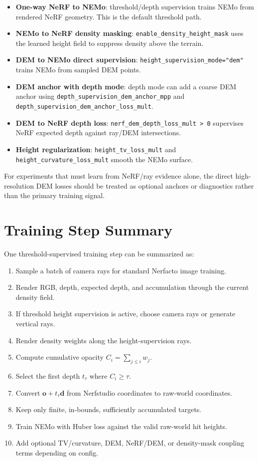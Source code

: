 \documentclass[11pt]{article}
\begin{document}
\begin{itemize}[leftmargin=*]
  \item \textbf{One-way NeRF to NEMo}: threshold/depth supervision trains NEMo from rendered NeRF geometry. This is the default threshold path.
  \item \textbf{NEMo to NeRF density masking}: \texttt{enable\_density\_height\_mask} uses the learned height field to suppress density above the terrain.
  \item \textbf{DEM to NEMo direct supervision}: \texttt{height\_supervision\_mode="dem"} trains NEMo from sampled DEM points.
  \item \textbf{DEM anchor with depth mode}: depth mode can add a coarse DEM anchor using \texttt{depth\_supervision\_dem\_anchor\_mpp} and \texttt{depth\_supervision\_dem\_anchor\_loss\_mult}.
  \item \textbf{DEM to NeRF depth loss}: \texttt{nerf\_dem\_depth\_loss\_mult > 0} supervises NeRF expected depth against ray/DEM intersections.
  \item \textbf{Height regularization}: \texttt{height\_tv\_loss\_mult} and \texttt{height\_curvature\_loss\_mult} smooth the NEMo surface.
\end{itemize}

For experiments that must learn from NeRF/ray evidence alone, the direct high-resolution DEM losses should be treated as optional anchors or diagnostics rather than the primary training signal.

\section{Training Step Summary}

One threshold-supervised training step can be summarized as:

\begin{enumerate}[leftmargin=*]
  \item Sample a batch of camera rays for standard Nerfacto image training.
  \item Render RGB, depth, expected depth, and accumulation through the current density field.
  \item If threshold height supervision is active, choose camera rays or generate vertical rays.
  \item Render density weights along the height-supervision rays.
  \item Compute cumulative opacity \(C_i=\sum_{j\le i}w_j\).
  \item Select the first depth \(t_\tau\) where \(C_i\ge\tau\).
  \item Convert \(\mathbf{o}+t_\tau\mathbf{d}\) from Nerfstudio coordinates to raw-world coordinates.
  \item Keep only finite, in-bounds, sufficiently accumulated targets.
  \item Train NEMo with Huber loss against the valid raw-world hit heights.
  \item Add optional TV/curvature, DEM, NeRF/DEM, or density-mask coupling terms depending on config.
\end{enumerate}
\end{document}
